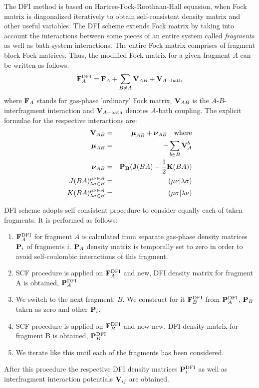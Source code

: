 \documentclass[a4paper,titlepage,twoside,fleqn]{article}
\newcommand{\BM}[1]{\ensuremath{\mbox{\boldmath${#1}$}}}
\begin{document}
The DFI method is based on Hartree-Fock-Roothaan-Hall 
equasion, when Fock matrix is diagonalized iteratively
to obtain self-consistent density matrix and other useful
variables. The DFI scheme extends Fock matrix by taking 
into account the interactions between some pieces of an 
entire system called \emph{fragments} as well as bath-system
interactions. The entire Fock matrix comprises of fragment
block Fock matrices. Thus, the modified Fock matrix for 
a given fragment $A$ can be written as follows:
\begin{equation}
{\bf F}_A^{\rm DFI} = {\bf F}_A + \sum_{B\neq A} {\bf V}_{AB} + {\bf V}_{A-{\rm bath}}
\end{equation}
where ${\bf F}_A$ stands for gas-phase 'ordinary' Fock matrix,
${\bf V}_{AB}$ is the $A$-$B$-interfragment interaction and
${\bf V}_{A-{\rm bath}}$ denotes $A$-bath coupling. The explicit 
formulae for the respective interactions are:
\begin{eqnarray}
{\bf V}_{AB} &=& {\BM \mu}_{AB} + {\BM \nu}_{AB}\quad \rm{where} \\
{\BM \mu}_{AB} &=& -\sum_{b\in B} {\bf V}_A^b         \\
{\BM \nu}_{AB} &=& {\bf P_B} ({\bf J}(BA) - \frac{1}{2}{\bf K}(BA)) \\
J(BA)_{\lambda\sigma\in B}^{\mu\nu\in A} &=& (\mu\nu|\lambda\sigma) \\
K(BA)_{\lambda\sigma\in B}^{\mu\nu\in A} &=& (\mu\sigma|\lambda\nu)
\end{eqnarray}

DFI scheme adopts self consistent procedure to consider equally each 
of taken fragments. It is performed as follows:
\begin{enumerate}
\item ${\bf F}_A^{\rm DFI}$ for fragment $A$ is calculated 
      from separate gas-phase density matrices ${\bf P}_i$
      of fragments $i$. ${\bf P}_A$ density matrix is temporally
      set to zero in order to avoid self-coulombic interactions
      of this fragment.
\item SCF procedure is applied on ${\bf F}_A^{\rm DFI}$ and new,
      DFI density matrix for fragment A is obtained, ${\bf P}_A^{\rm DFI}$
\item We switch to the next fragment, $B$. We construct for it 
      ${\bf F}_B^{\rm DFI}$ from ${\bf P}_A^{\rm DFI}$,  ${\bf P}_B$ taken
      as zero and other ${\bf P}_i$. 
\item SCF procedure is applied on ${\bf F}_B^{\rm DFI}$ and now new,
      DFI density matrix for fragment B is obtained, ${\bf P}_B^{\rm DFI}$
\item We iterate like this until each of the fragments has been considered.
\end{enumerate}
After this procedure the respective DFI density matrices 
${\bf P}_i^{\rm DFI}$ as well as interfragment interaction 
potentials ${\bf V}_{ij}$ are obtained.  
\end{document}
